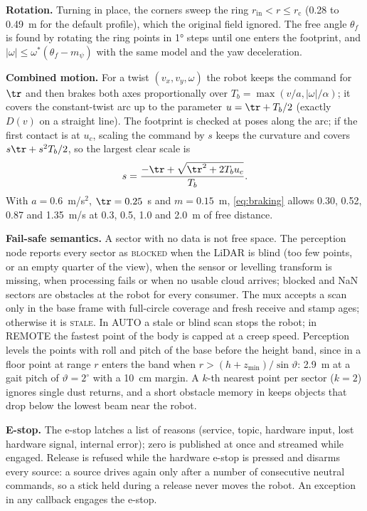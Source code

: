 \textbf{Rotation.} Turning in place, the corners sweep the ring $r_{\mathrm{in}} < r \le
r_{\mathrm{c}}$ (0.28 to 0.49~m for the default profile), which the original field ignored. The
free angle $\theta_f$ is found by rotating the ring points in 1° steps until one enters the
footprint, and $|\omega| \le \omega^*(\theta_f - m_\psi)$ with the same model and the yaw
deceleration.

\textbf{Combined motion.} For a twist $(v_x, v_y, \omega)$ the robot keeps the command for
$\tr$ and then brakes both axes proportionally over $T_b = \max(v/a, |\omega|/\alpha)$; it
covers the constant-twist arc up to the parameter $u = \tr + T_b/2$ (exactly $D(v)$ on a
straight line). The footprint is checked at poses along the arc; if the first contact is at
$u_c$, scaling the command by $s$ keeps the curvature and covers $s\tr + s^2 T_b/2$, so the
largest clear scale is
\begin{equation}
  s = \frac{-\tr + \sqrt{\tr^2 + 2 T_b u_c}}{T_b}.
\end{equation}
With $a = 0.6$~m/s$^2$, $\tr = 0.25$~s and $m = 0.15$~m, \eqref{eq:braking} allows 0.30, 0.52,
0.87 and 1.35~m/s at 0.3, 0.5, 1.0 and 2.0~m of free distance.

\textbf{Fail-safe semantics.} A sector with no data is not free space. The perception node
reports every sector as \textsc{blocked} when the LiDAR is blind (too few points, or an empty
quarter of the view), when the sensor or levelling transform is missing, when processing fails
or when no usable cloud arrives; blocked and NaN sectors are obstacles at the robot for every
consumer. The mux accepts a scan only in the base frame with full-circle coverage and fresh
receive and stamp ages; otherwise it is \textsc{stale}. In AUTO a stale or blind scan stops the
robot; in REMOTE the fastest point of the body is capped at a creep speed. Perception levels
the points with roll and pitch of the base before the height band, since in  a
floor point at range $r$ enters the band when $r > (h + z_{\min})/\sin\vartheta$: 2.9~m at a
gait pitch of $\vartheta = 2^\circ$ with a 10~cm margin. A $k$-th nearest point per sector
($k = 2$) ignores single dust returns, and a short obstacle memory in  keeps objects
that drop below the lowest beam near the robot.

\textbf{E-stop.} The e-stop latches a list of reasons (service, topic, hardware input, lost
hardware signal, internal error); zero is published at once and streamed while engaged. Release
is refused while the hardware e-stop is pressed and disarms every source: a source drives again
only after a number of consecutive neutral commands, so a stick held during a release never
moves the robot. An exception in any callback engages the e-stop.

